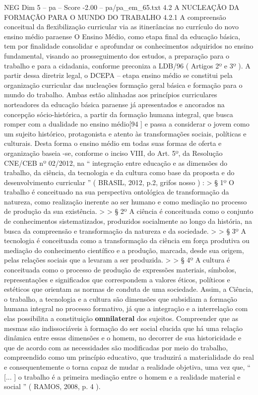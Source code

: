 \begin{textsample}{NEG Dim 5 – pa – Score -2.00 – pa/pa\_em\_65.txt}  \label{ex:f5_neg_041}
4.2 A NUCLEAÇÃO DA FORMAÇÃO PARA O MUNDO DO TRABALHO 4.2.1 A compreensão conceitual da flexibilização curricular via as itinerâncias no currículo do novo ensino médio paraense O Ensino Médio, como etapa final da educação básica, tem por finalidade consolidar e aprofundar os conhecimentos adquiridos no ensino fundamental, visando ao prosseguimento dos estudos, a preparação para o trabalho e para a cidadania, conforme preconiza a LDB/96 ( Artigos 2º e 3º ).
A partir dessa diretriz legal, o DCEPA – etapa ensino médio se constitui pela organização curricular das nucleações formação geral básica e formação para o mundo do trabalho.
Ambas estão alinhadas aos princípios curriculares norteadores da educação básica paraense já apresentados e ancorados na concepção sócio-histórica, a partir da formação humana integral, que busca romper com a dualidade no ensino médio[94 ] e passa a considerar o jovem como um sujeito histórico, protagonista e atento às transformações sociais, políticas e culturais.
Desta forma o ensino médio em todas suas formas de oferta e organização baseia -se, conforme o inciso VIII, do Art. 5º, da Resolução CNE/CEB nº 02/2012, na “ integração entre educação e as dimensões do trabalho, da ciência, da tecnologia e da cultura como base da proposta e do desenvolvimento curricular ” ( BRASIL, 2012, p.2, grifos nosso ) : > § 1º O trabalho é conceituado na sua perspectiva ontológica de transformação da natureza, como realização inerente ao ser humano e como mediação no processo de produção da sua existência. > > § 2º A ciência é conceituada como o conjunto de conhecimentos sistematizados, produzidos socialmente ao longo da história, na busca da compreensão e transformação da natureza e da sociedade. > > § 3º A tecnologia é conceituada como a transformação da ciência em força produtiva ou mediação do conhecimento científico e a produção, marcada, desde sua origem, pelas relações sociais que a levaram a ser produzida. > > § 4º A cultura é conceituada como o processo de produção de expressões materiais, símbolos, representações e significados que correspondem a valores éticos, políticos e estéticos que orientam as normas de conduta de uma sociedade.
Assim, a Ciência, o trabalho, a tecnologia e a cultura são dimensões que subsidiam a formação humana integral no processo formativo, já que a integração e a interrelação com elas possibilita a constituição \textbf{omnilateral} dos sujeitos.
Compreender que as mesmas são indissociáveis à formação do ser social elucida que há uma relação dinâmica entre essas dimensões e o homem, no decorrer de sua historicidade e que de acordo com as necessidades são modificadas por meio do trabalho, compreendido como um princípio educativo, que traduzirá a materialidade do real e consequentemente o torna capaz de mudar a realidade objetiva, uma vez que, “ [... ] o trabalho é a primeira mediação entre o homem e a realidade material e social ” ( RAMOS, 2008, p. 4 ).

\end{textsample}
